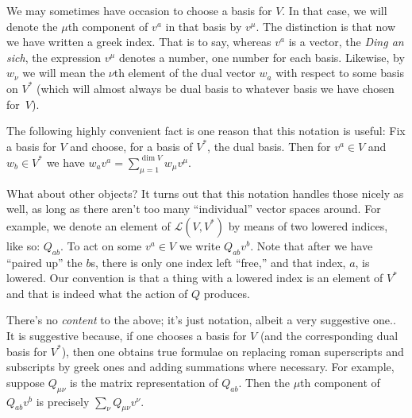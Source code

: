 \documentclass[10pt, a4paper]{article}
\begin{document}
We may sometimes have occasion to choose a basis for $V$. In that
case, we will denote the $\mu$th component of $v^a$ in that basis by
$v^\mu$. The distinction is that now we have written a greek index. That
is to say, whereas $v^a$ is a vector, the \emph{Ding an sich}, the
expression $v^\mu$ denotes a number, one number for each
basis. Likewise, by $w_\nu$ we will mean the $\nu$th element of the dual
vector $w_a$ with respect to some basis on $V^*$ (which will almost
always be dual basis to whatever basis we have chosen for~$V$).

The following highly convenient fact is one reason that this notation
is useful: Fix a basis for $V$ and choose, for a basis of $V^*$, the
dual basis. Then for $v^a\in V$ and $w_b\in V^*$ we have
$w_av^a = \sum_{\mu=1}^{\dim V} w_\mu v^\mu$.


What about other objects? It turns out that this notation handles
those nicely as well, as long as there aren't too many “individual”
vector spaces around. For example, we denote an element of
$\mathcal{L}(V,V^*)$ by means of two lowered indices, like so:
$Q_{ab}$. To act on some $v^a\in V$ we write $Q_{ab}v^b$. Note that
after we have “paired up” the $b$s, there is only one index left
“free,” and that index, $a$, is lowered. Our convention is that a
thing with a lowered index is an element of $V^*$ and that is indeed
what the action of $Q$ produces.

There's no \emph{content} to the above; it's just notation, albeit a
very suggestive one.. It is suggestive because, if one chooses a basis
for $V$ (and the corresponding dual basis for $V^*$), then one obtains
true formulae on replacing roman superscripts and subscripts by greek
ones and adding summations where necessary. For example, suppose
$Q_{\mu\nu}$ is the matrix representation of $Q_{ab}$. Then the
$\mu$th component of $Q_{ab}v^b$ is precisely $\sum_\nu Q_{\mu\nu}v^\nu$.
\end{document}
